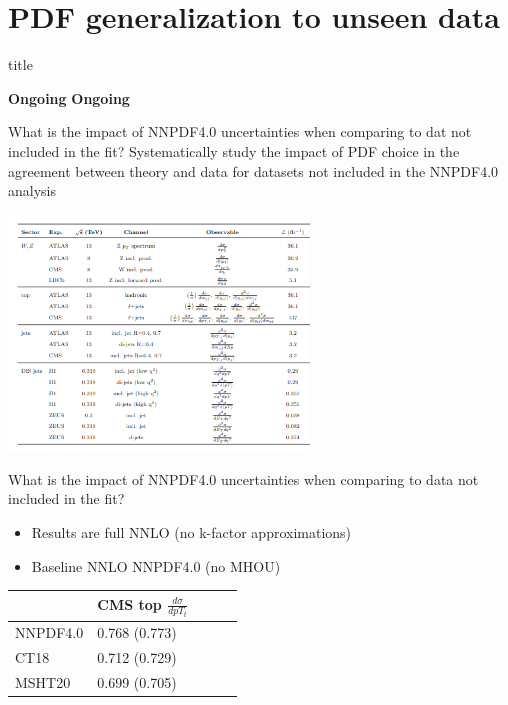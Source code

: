 \documentclass[aspectratio=43, 8pt,t]{beamer}
\newcommand{\SectionTitleFrame}[1][]{%
  \begin{frame}
    \vfill
    \centering
    \begin{beamercolorbox}[sep=8pt,center,shadow=true,rounded=true]{title}
      \usebeamerfont{title}\insertsection\par
    \end{beamercolorbox}
    \ifx\relax#1\relax\else
      \vspace{0.5cm}
      \textbf{#1}
    \fi
    \vfill
  \end{frame}
}
\begin{document}
\section*{PDF generalization to unseen data}
\SectionTitleFrame[\textbf{Ongoing}]

\begin{frame}{What is the impact of NNPDF4.0 uncertainties when comparing to dat not included in the fit?}
  Systematically study the impact of PDF choice in the agreement between theory and data for datasets not included in the NNPDF4.0 analysis

  \includegraphics[width=0.6\textwidth]{pheno_paper_datastes.png}

\end{frame}

\begin{frame}{What is the impact of NNPDF4.0 uncertainties when comparing to data not included in the fit?}
  \begin{itemize}
    \item Results are full NNLO (no k-factor approximations)
    \item Baseline NNLO NNPDF4.0 (no MHOU)
  \end{itemize}

  \begin{table}[]
    \begin{tabular}{@{}lllll@{}}
    \toprule
            & CMS top $\frac{d\sigma}{dpT_t}$ &  &  &  \\ \midrule
    NNPDF4.0 & 0.768 (0.773)                        &  &  &  \\
    CT18     & 0.712 (0.729)                        &  &  &  \\
    MSHT20   & 0.699 (0.705)                        &  &  &  \\ \bottomrule
    \end{tabular}
  \end{table}


\end{frame}
\end{document}
